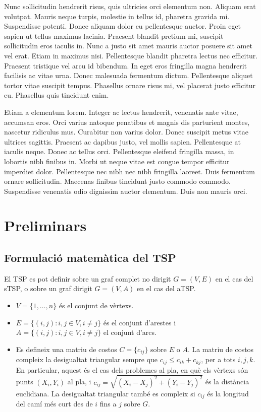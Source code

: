 \documentclass[a4paper,12pt,twoside]{ThesisStyle}
\begin{document}
Nunc sollicitudin hendrerit risus, quis ultricies orci elementum non. Aliquam erat volutpat. Mauris neque turpis, molestie in tellus id, pharetra gravida mi. Suspendisse potenti. Donec aliquam dolor eu pellentesque auctor. Proin eget sapien ut tellus maximus lacinia. Praesent blandit pretium mi, suscipit sollicitudin eros iaculis in. Nunc a justo sit amet mauris auctor posuere sit amet vel erat. Etiam in maximus nisi. Pellentesque blandit pharetra lectus nec efficitur. Praesent tristique vel arcu id bibendum. In eget eros fringilla magna hendrerit facilisis ac vitae urna. Donec malesuada fermentum dictum. Pellentesque aliquet tortor vitae suscipit tempus. Phasellus ornare risus mi, vel placerat justo efficitur eu. Phasellus quis tincidunt enim.

Etiam a elementum lorem. Integer ac lectus hendrerit, venenatis ante vitae, accumsan eros. Orci varius natoque penatibus et magnis dis parturient montes, nascetur ridiculus mus. Curabitur non varius dolor. Donec suscipit metus vitae ultrices sagittis. Praesent ac dapibus justo, vel mollis sapien. Pellentesque at iaculis neque. Donec ac tellus orci. Pellentesque eleifend fringilla massa, in lobortis nibh finibus in. Morbi ut neque vitae est congue tempor efficitur imperdiet dolor. Pellentesque nec nibh nec nibh fringilla laoreet. Duis fermentum ornare sollicitudin. Maecenas finibus tincidunt justo commodo commodo. Suspendisse venenatis odio dignissim auctor elementum. Duis non mauris orci.



\chapter{Preliminars}
\label{cap:prelim}

\section{Formulació matemàtica del TSP}
\label{Formulacio}

El TSP es pot definir sobre un graf complet no dirigit \( G = (V, E) \) en el cas del sTSP, o sobre un graf dirigit \( G = (V, A) \) en el cas del aTSP.

\begin{itemize}
  \item \( V = \{1, \dots, n\} \) és el conjunt de vèrtexs.
  \item \( E = \{ (i,j) : i,j \in V, i \neq j \} \) és el conjunt d'arestes i \( A = \{ (i,j) : i,j \in V, i \neq j \} \) el conjunt d'arcs.
  \item Es defineix una matriu de costos \( C = \{c_{ij}\} \) sobre \( E \) o \( A \). La matriu de costos compleix la desigualtat triangular sempre que \( c_{ij} \leq c_{ik} + c_{kj} \), per a tots \( i, j, k \). En particular, aquest és el cas dels problemes al pla, en què els vèrtexs són punts \( (X_i, Y_i) \) al pla, i \( c_{ij} = \sqrt{(X_i - X_j)^2 + (Y_i - Y_j)^2} \) és la distància euclidiana. La desigualtat triangular també es compleix si \( c_{ij} \) és la longitud del camí més curt des de \( i \) fins a \( j \) sobre \( G \).
\end{itemize}
\end{document}

